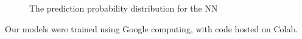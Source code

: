 \documentclass[letterpaper]{article} %
\begin{document}
\begin{figure}[!htb]
        \caption{\label{fig:nn_prediction_distribution} The prediction probability distribution for the NN}
\end{figure}

Our models were trained using Google computing, with code hosted on Colab. 

\newpage


\end{document}
